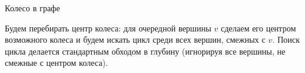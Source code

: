 \begin{tutorial}{Колесо в графе}

Будем перебирать центр колеса: для очередной вершины $v$ сделаем его центром возможного колеса и будем искать цикл среди всех вершин, смежных с $v$. Поиск цикла делается стандартным обходом в глубину (игнорируя все вершины, не смежные с центром колеса).

\end{tutorial}
